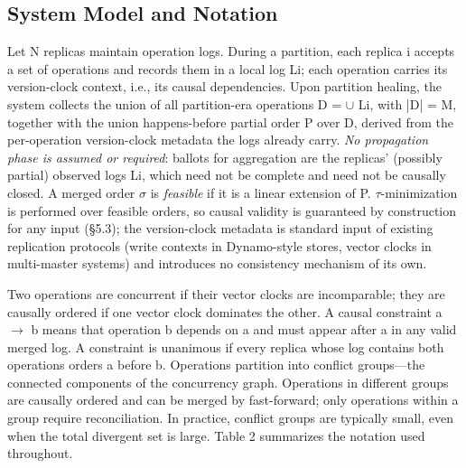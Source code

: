 \documentclass[11pt]{article}
\begin{document}
\subsection{System Model and Notation}
Let N replicas maintain operation logs. During a partition, each replica i accepts a set of operations and records them in a local log Li; each operation carries its version-clock context, i.e., its causal dependencies. Upon partition healing, the system collects the union of all partition-era operations D = $\cup $ Li, with |D| = M, together with the union happens-before partial order P over D, derived from the per-operation version-clock metadata the logs already carry. \emph{No propagation phase is assumed or required}: ballots for aggregation are the replicas' (possibly partial) observed logs Li, which need not be complete and need not be causally closed. A merged order $\sigma $ is \emph{feasible} if it is a linear extension of P. $\tau $-minimization is performed over feasible orders, so causal validity is guaranteed by construction for any input (§5.3); the version-clock metadata is standard input of existing replication protocols (write contexts in Dynamo-style stores, vector clocks in multi-master systems) and introduces no consistency mechanism of its own.

Two operations are concurrent if their vector clocks are incomparable; they are causally ordered if one vector clock dominates the other. A causal constraint a $\rightarrow $ b means that operation b depends on a and must appear after a in any valid merged log. A constraint is unanimous if every replica whose log contains both operations orders a before b. Operations partition into conflict groups—the connected components of the concurrency graph. Operations in different groups are causally ordered and can be merged by fast-forward; only operations within a group require reconciliation. In practice, conflict groups are typically small, even when the total divergent set is large. Table 2 summarizes the notation used throughout.
\end{document}
